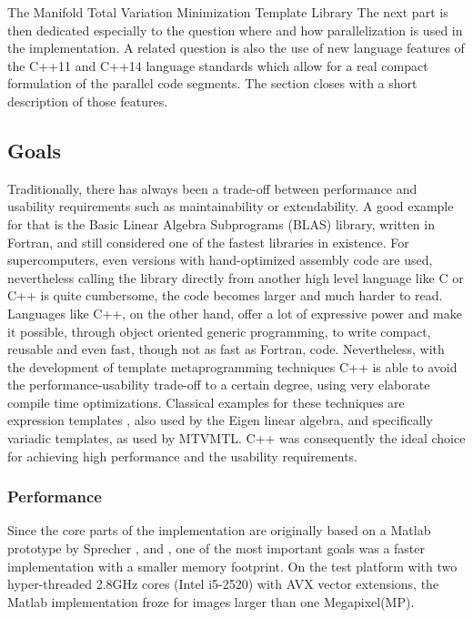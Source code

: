 \begin{chapter}{The Manifold Total Variation Minimization Template Library}
The next part is then dedicated especially to the question where and how parallelization is used in the implementation.
A related question is also the use of new language features of the C++11 and C++14 language standards 
which allow for a real compact formulation of the parallel code segments. 
The section closes with a short description of those features.

\subsection{Goals} %
\label{sub:Goals}
Traditionally, there has always been a trade-off between performance and usability requirements such as
maintainability or extendability. A good example for that is the Basic Linear Algebra Subprograms 
(BLAS) library, written in Fortran, and still considered one of the fastest libraries in existence. 
For supercomputers, even versions with hand-optimized assembly code are used, nevertheless calling
the library directly from another high level language like C or C++ is quite cumbersome, the code becomes
larger and much harder to read. \\

Languages like C++, on the other hand, offer a lot of expressive power and make it possible, through object oriented
generic programming, to write compact, reusable and even fast, though not as fast as Fortran, code. Nevertheless,
with the development of template metaprogramming techniques C++ is able to avoid the performance-usability
trade-off to a certain degree, using very elaborate compile time optimizations. Classical examples for these techniques are expression templates \cite{blitz}, also used by the Eigen linear algebra, and specifically variadic templates, as used by MTVMTL.
C++ was consequently the ideal choice for achieving high performance and the usability requirements.

\subsubsection{Performance} %
\label{ssub:Performance}
Since the core parts of the implementation are originally based on a Matlab prototype by Sprecher \cite{SprecherIRLS}, \cite{manuel} and \cite{mara}, one of the most important
goals was a faster implementation with a smaller memory footprint. On the test platform with two hyper-threaded 2.8GHz cores (Intel i5-2520) with AVX vector extensions,
the Matlab implementation froze for images larger than one Megapixel(MP).\\


\end{chapter}
